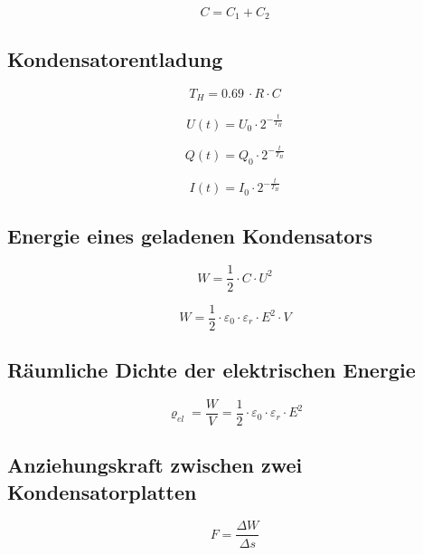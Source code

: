 \begin{equation}\label{eq:kondensator:parallelschaltung:kapazitaet}
C = C_1 + C_2
\end{equation}

\subsection{Kondensatorentladung}
\begin{equation}\label{eq:kondensator:entladung:zeit}
T_H = \SI{0.69}{} \cdot R \cdot C
\end{equation}

\begin{equation}\label{eq:kondensator:entladung:spannung}
U(t) = U_0 \cdot 2^{-\frac{t}{T_H}}
\end{equation}

\begin{equation}\label{eq:kondensator:entladung:ladung}
Q(t) = Q_0 \cdot 2^{-\frac{t}{T_H}}
\end{equation}

\begin{equation}\label{eq:kondensator:entladung:strom}
I(t) = I_0 \cdot 2^{-\frac{t}{T_H}}
\end{equation}

\subsection{Energie eines geladenen Kondensators}
\begin{equation}\label{eq:kondensator:energie:spannung}
W = \frac{1}{2} \cdot C \cdot U^2
\end{equation}

\begin{equation}\label{eq:kondensator:energie:feld}
W = \frac{1}{2} \cdot \varepsilon_0 \cdot \varepsilon_r \cdot E^2 \cdot V
\end{equation}

\subsection{Räumliche Dichte der elektrischen Energie}
\begin{equation}\label{eq:rauemliche:dicht:elektrische:energie}
\varrho_{el} = \frac{W}{V} = \frac{1}{2} \cdot \varepsilon_0 \cdot \varepsilon_r \cdot
 E^2
\end{equation}

\subsection{Anziehungskraft zwischen zwei Kondensatorplatten}
\begin{equation}\label{eq:kondensator:anziehungskraft}
F = \frac{\Delta W}{\Delta s}
\end{equation}

